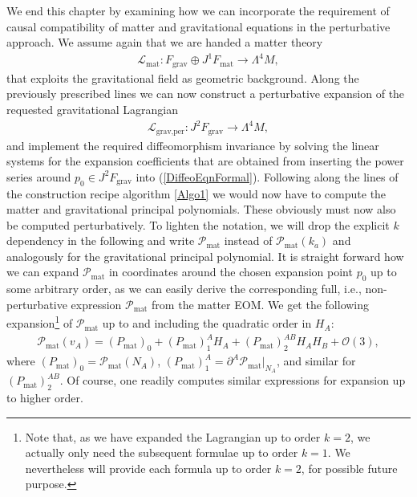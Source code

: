 We end this chapter by examining how we can incorporate the requirement of causal compatibility of matter and gravitational equations in the perturbative approach.
We assume again that we are handed a matter theory 
\begin{align}
    \mathcal{L}_{\text{mat}} : F_{\text{grav}} \oplus J^1F_{\text{mat}} \longrightarrow \Lambda^4M,
\end{align}
that exploits the gravitational field as geometric background. Along the previously prescribed lines we can now construct a perturbative expansion of the requested gravitational Lagrangian
\begin{align}
    \mathcal{L}_{\text{grav,per}} : J^2F_{\text{grav}} \longrightarrow \Lambda^4M,
\end{align}
and implement the required diffeomorphism invariance by solving the linear systems for the expansion coefficients that are obtained from inserting the power series around $p_0 \in J^2F_{\text{grav}}$ into (\ref{DiffeoEqnFormal}). 
Following along the lines of the construction recipe algorithm \ref{Algo1} we would now have to compute the matter and gravitational principal polynomials.
These obviously must now also be computed perturbatively. 
To lighten the notation, we will drop the explicit $k$ dependency in the following and write $\mathcal{P}_{\text{mat}}$ instead of $\mathcal{P}_{\text{mat}}(k_a)$ and analogously for the gravitational principal polynomial. It is straight forward how we can expand $\mathcal{P}_{\text{mat}}$ in coordinates around the chosen expansion point $p_0$ up to some arbitrary order, as we can easily derive the corresponding full, i.e., non-perturbative expression $\mathcal{P}_{\text{mat}}$ from the matter EOM. We get the following expansion\footnote{Note that, as we have expanded the Lagrangian up to order $k=2$, we actually only need the subsequent formulae up to order $k=1$. We nevertheless will provide each formula up to order $k=2$, for possible future purpose.} of $\mathcal{P}_{\text{mat}}$ up to and including the quadratic order in $H_A$:
\begin{align}
    \mathcal{P}_{\text{mat}}(v_A) = (P_{\text{mat}})_{0} + (P_{\text{mat}})^A_1 H_A+ (P_{\text{mat}})^{AB}_2 H_A H_B +\mathcal{O}(3),
\end{align}
where $(P_{\text{mat}})_0 = \mathcal{P}_{\text{mat}}(N_A)$, $(P_{\text{mat}})_1^A = \partial^A \mathcal{P}_{\text{mat}}\big \vert _{N_A}$, and similar for $(P_{\text{mat}})^{AB}_2$. Of course, one readily computes similar expressions for expansion up to higher order. 

